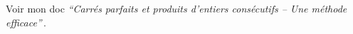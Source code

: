 \leavevmode
\smallskip

Voir mon doc \emph{\enquote{Carrés parfaits et produits d’entiers consécutifs – Une méthode efficace}}\,.


